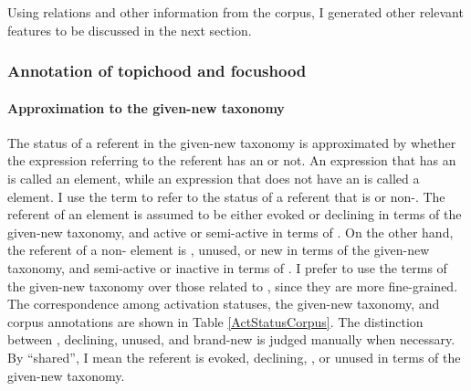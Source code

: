 Using  relations and other information from the corpus,
I generated other relevant features to be discussed in the next section.

\subsubsection{Annotation of topichood and focushood}\label{FW:Cor:TopFoc}

\paragraph{Approximation to the given-new taxonomy}

The status of a referent in the given-new taxonomy is approximated by
whether the expression referring to the referent has an  or not.
An expression that has an  is called an  element,
while an expression that does not have an  is called a  element.
I use the term  to refer to the status of a referent that is  or non-.
The referent of an  element is assumed to be either evoked or declining in terms of the given-new taxonomy, and active or semi-active in terms of .
On the other hand, the referent of a non- element is , unused, or new in terms of the given-new taxonomy, and
semi-active or inactive in terms of .
I prefer to use the terms of the given-new taxonomy over those related to , since
they are more fine-grained.
The correspondence among activation statuses, the given-new taxonomy, and corpus annotations are shown in Table \ref{ActStatusCorpus}.
The distinction between , declining, unused, and brand-new is judged manually when necessary.
By ``shared'', I mean the referent is evoked, declining, , or unused in terms of the given-new taxonomy.

